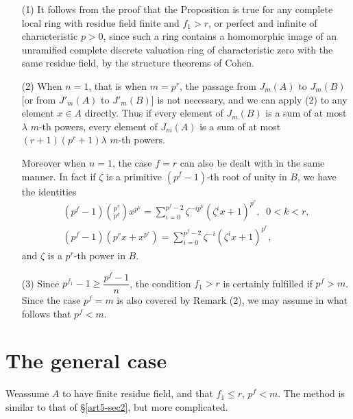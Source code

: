\begin{remarks*}%
\begin{enumerate}
\item[(1)] It follows from the proof that the Proposition is true for any complete local ring with residue field finite and $f_1 > r$, or perfect and infinite of characteristic $p>0$, since such a ring contains a homomorphic image of an unramified complete discrete valuation ring of characteristic zero with the same residue field, by the structure theorems of Cohen.

\item[(2)] When $n =1$, that is when $m=p^r$, the passage from $J_m(A)$ to $J_m(B)$ [or from $J'_m(A)$ to $J'_m(B)$] is not necessary, and we can apply (2) to any element $x \in A$ directly. Thus if every element of $J_m(B)$ is a sum of at most $\lambda$ $m$-th powers, every element of $J_m(A)$ is a sum of at most $(r+1) (p^r +1)\lambda$ $m$-th powers. 

Moreover when $n=1$, the case $f =r$ can also be dealt with in the same manner. In fact if $\zeta$ is a primitive $(p^f-1)$-th root of unity in $B$, we have the identities
\begin{gather*}
(p^f -1) \binom{p^r}{p^k} x^{p^k} = \sum\limits^{p^f -2}_{i=0} \zeta^{-ip^k} (\zeta^i x +1)^{p^r}, \;\; 0 < k < r,\\
(p^f -1) (p^r x + x^{p^r}) = \sum\limits^{p^f -2}_{i=0} \zeta^{-i} (\zeta^{i} x+ 1)^{p^r},
\end{gather*}
and $\zeta$ is a $p^r$-th power in $B$.

\item[(3)] Since $p^{f_1} -1 \geq \dfrac{p^f-1}{n}$, the condition $f_1 >r$ is certainly fulfilled if $p^f>m$. Since the case $p^f =m$ is also covered by Remark (2), we may assume in what follows that $p^f < m$.
\end{enumerate}
\end{remarks*}

\section{The general case}\label{art5-sec3}
We\pageoriginale assume $A$ to have finite residue field, and that $f_1 \leq r$, $p^f < m$. The method is similar to that of \S \ref{art5-sec2}, but more complicated.

